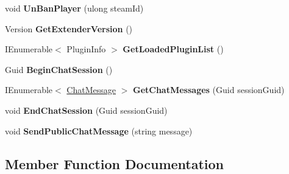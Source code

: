 \begin{DoxyCompactItemize}
\item 
\hypertarget{interface_s_e_comm_1_1_i_server_service_aee78dbffac6d3ded48f2d6d58a25b93d}{}void {\bfseries Un\+Ban\+Player} (ulong steam\+Id)\label{interface_s_e_comm_1_1_i_server_service_aee78dbffac6d3ded48f2d6d58a25b93d}

\item 
\hypertarget{interface_s_e_comm_1_1_i_server_service_a11315e2f6e20dceb527f574d0d920aad}{}Version {\bfseries Get\+Extender\+Version} ()\label{interface_s_e_comm_1_1_i_server_service_a11315e2f6e20dceb527f574d0d920aad}

\item 
\hypertarget{interface_s_e_comm_1_1_i_server_service_aae61a35ae16e2af49b8c1e8af48ee4d6}{}I\+Enumerable$<$ Plugin\+Info $>$ {\bfseries Get\+Loaded\+Plugin\+List} ()\label{interface_s_e_comm_1_1_i_server_service_aae61a35ae16e2af49b8c1e8af48ee4d6}

\item 
\hypertarget{interface_s_e_comm_1_1_i_server_service_a31473a0de8d75cb994a52eb5b4552282}{}Guid {\bfseries Begin\+Chat\+Session} ()\label{interface_s_e_comm_1_1_i_server_service_a31473a0de8d75cb994a52eb5b4552282}

\item 
\hypertarget{interface_s_e_comm_1_1_i_server_service_a1e98f4992a4dd3abba12f0fb33a6c973}{}I\+Enumerable$<$ \hyperlink{class_s_e_mod_a_p_i_internal_1_1_a_p_i_1_1_chat_1_1_chat_message}{Chat\+Message} $>$ {\bfseries Get\+Chat\+Messages} (Guid session\+Guid)\label{interface_s_e_comm_1_1_i_server_service_a1e98f4992a4dd3abba12f0fb33a6c973}

\item 
\hypertarget{interface_s_e_comm_1_1_i_server_service_ae155c0123d1a5c2d959fab27af827e4c}{}void {\bfseries End\+Chat\+Session} (Guid session\+Guid)\label{interface_s_e_comm_1_1_i_server_service_ae155c0123d1a5c2d959fab27af827e4c}

\item 
\hypertarget{interface_s_e_comm_1_1_i_server_service_a6042b2fada58c327f5a616bed89c2fc4}{}void {\bfseries Send\+Public\+Chat\+Message} (string message)\label{interface_s_e_comm_1_1_i_server_service_a6042b2fada58c327f5a616bed89c2fc4}

\end{DoxyCompactItemize}


\subsection{Member Function Documentation}
\hypertarget{interface_s_e_comm_1_1_i_server_service_a3ac39f5e58c50a4c4bc92b576774f749}{}
